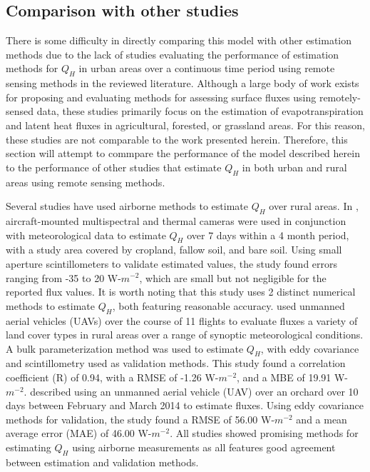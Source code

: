 \FloatBarrier

\subsection{Comparison with other studies}
There is some difficulty in directly comparing this model with other estimation methods due to the lack of studies evaluating the performance of estimation methods for $Q_H$ in urban areas over a continuous time period using remote sensing methods in the reviewed literature. Although a large body of work exists for proposing and evaluating methods for assessing surface fluxes using remotely-sensed data, these studies  primarily focus on the estimation of evapotranspiration and latent heat fluxes in agricultural, forested,  or grassland areas. For this reason, these studies are not comparable to the work presented herein. Therefore,  this section will attempt to commpare the performance of the model described herein to the performance of other studies that estimate $Q_H$ in both urban and rural areas using remote sensing methods.

Several studies have used airborne methods to estimate $Q_H$ over rural areas. In \citet{Cammalleri_2012}, aircraft-mounted multispectral and thermal cameras were used in conjunction with meteorological data to estimate $Q_H$ over 7 days within a 4 month period, with a study area covered by cropland, fallow soil, and bare soil. Using small aperture scintillometers to validate estimated values, the study found errors ranging from -35 to 20 W-$m^{-2}$, which are small but not negligible for the reported flux values. It is worth noting that this study uses 2 distinct numerical methods to estimate $Q_H$, both featuring  reasonable accuracy.  \citet{Kim_2019} used unmanned aerial vehicles (UAVs) over the course of 11 flights to evaluate fluxes a variety of land cover types in rural areas over a range of synoptic meteorological conditions. A bulk parameterization method was used to estimate $Q_H$, with eddy covariance and scintillometry used as validation methods. This study found a correlation coefficient (R) of 0.94, with a RMSE of -1.26 W-$m^{-2}$, and a MBE of 19.91 W-$m^{-2}$. \citet{Ortega-Farias_2016} described using an unmanned aerial vehicle (UAV) over an orchard over 10 days between February and March 2014 to estimate fluxes. Using eddy covariance methods for validation, the study found a RMSE of 56.00 W-$m^{-2}$ and a mean average error (MAE) of 46.00 W-$m^{-2}$.  All studies showed promising methods for estimating $Q_H$ using airborne measurements as all features good agreement between estimation and validation methods. 


